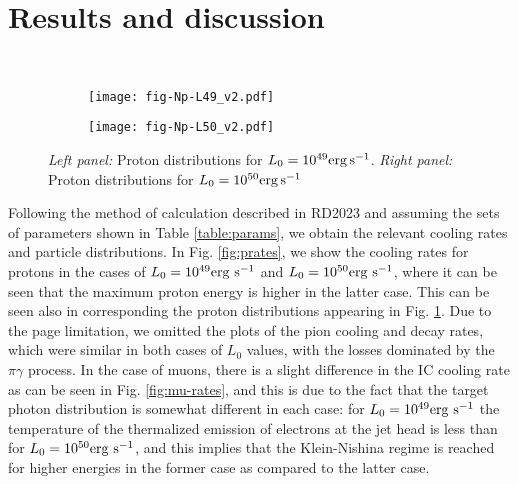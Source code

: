 \documentclass[baaa]{baaa}
\begin{document}
\section{Results and discussion}\label{sec:results}
%
\begin{figure*}[h!]                            %
\  \centering
    \begin{subfigure}[t]{0.47\textwidth}
        \centering                          
        \texttt{[image: fig-Np-L49\_v2.pdf]} 
    \end{subfigure}
    \hfill
    \begin{subfigure}[t]{0.47\textwidth}
        \centering
        \texttt{[image: fig-Np-L50\_v2.pdf]} 
    \end{subfigure}
    \caption{{\emph{Left panel:} Proton distributions for $L_0=10^{49}{\rm erg \, s^{-1}}$. {\emph{Right panel:} Proton distributions for $L_0=10^{50}{\rm erg \, s^{-1}}$}}}\label{fig:Nps}
\end{figure*}


Following the method of calculation described in RD2023 and assuming the sets of parameters shown in Table \ref{table:params}, we obtain the relevant cooling rates and particle distributions. In Fig. \ref{fig:prates}, we show the cooling rates for protons in the cases of $L_0=10^{49}\rm erg\ s^{-1}$ and $L_0=10^{50}\rm erg\ s^{-1}$, where it can be seen that the maximum proton energy is higher in the latter case. This can be seen also in corresponding the proton distributions appearing in Fig. \ref{fig:Nps}. Due to the page limitation, we omitted the plots of the pion cooling and decay rates, which were similar in both cases of $L_0$ values, with the losses dominated by the $\pi\gamma$ process. In the case of muons, there is a slight difference in the IC cooling rate as can be seen in Fig. \ref{fig:mu-rates}, and this is due to the fact that the target photon distribution is somewhat different in each case: for $L_0=10^{49}{\rm erg\ s^{-1}}$ the temperature of the thermalized emission of electrons at the jet head is less than for $L_0=10^{50}{\rm erg\ s^{-1}}$, and this implies that the Klein-Nishina regime is reached for higher energies in the former case as compared to the latter case.
\end{document}
